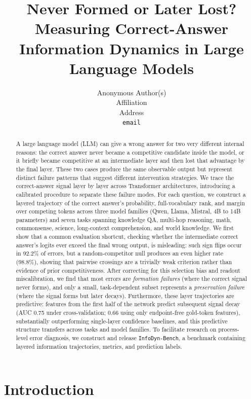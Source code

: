 \documentclass{article} %
\title{Never Formed or Later Lost? Measuring Correct-Answer Information Dynamics in Large Language Models}
\author{Anonymous Author(s) \\
Affiliation \\
Address \\
\texttt{email}
}
\begin{document}
\maketitle

\begin{abstract}
A large language model (LLM) can give a wrong answer for two very different internal reasons: the correct answer never became a competitive candidate inside the model, or it briefly became competitive at an intermediate layer and then lost that advantage by the final layer. These two cases produce the same observable output but represent distinct failure patterns that suggest different intervention strategies. We trace the correct-answer signal layer by layer across Transformer architectures, introducing a calibrated procedure to separate these failure modes. For each question, we construct a layered trajectory of the correct answer's probability, full-vocabulary rank, and margin over competing tokens across three model families (Qwen, Llama, Mistral, 4B to 14B parameters) and seven tasks spanning knowledge QA, multi-hop reasoning, math, commonsense, science, long-context comprehension, and world knowledge. We first show that a common evaluation shortcut, checking whether the intermediate correct answer's logits ever exceed the final wrong output, is misleading: such sign flips occur in 92.2\% of errors, but a random-competitor null produces an even higher rate (98.8\%), showing that pairwise crossings are a trivially weak criterion rather than evidence of prior competitiveness. After correcting for this selection bias and readout miscalibration, we find that most errors are \emph{formation failures} (where the correct signal never forms), and only a small, task-dependent subset represents a \emph{preservation failure} (where the signal forms but later decays). Furthermore, these layer trajectories are predictive: features from the first half of the network predict subsequent signal decay (AUC 0.75 under cross-validation; 0.66 using only endpoint-free gold-token features), substantially outperforming single-layer confidence baselines, and this predictive structure transfers across tasks and model families. To facilitate research on process-level error diagnosis, we construct and release \texttt{InfoDyn-Bench}, a benchmark containing layered information trajectories, metrics, and prediction labels.
\end{abstract}

\section{Introduction}
\end{document}
